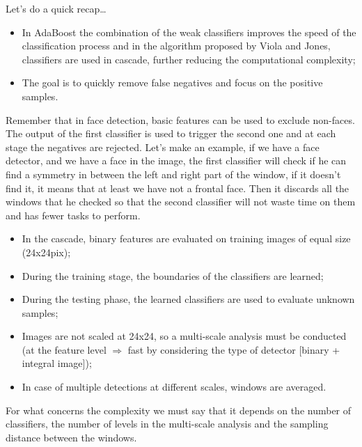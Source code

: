 Let's do a quick recap\dots
\begin{itemize}
    \item In AdaBoost the combination of the weak classifiers improves the speed of the classification process and in the algorithm proposed by Viola and Jones, classifiers are used
in cascade, further reducing the computational complexity;
    \item The goal is to quickly remove false negatives and focus on the positive samples.
\end{itemize}
Remember that in face detection, basic features can be used to exclude non-faces.
The output of the first classifier is used to trigger the second one and at each stage the negatives are rejected.
Let's make an example, if we have a face detector, and we have a face in the image, the first classifier will check if he can find a symmetry in between the left and right part of the window, if it doesn't find it, it means that at least we have not a frontal face. Then it discards all the windows that he checked so that the second classifier will not waste time on them and has fewer tasks to perform.
\begin{itemize}
    \item In the cascade, binary features are evaluated on training images of equal size (24x24pix);
    \item During the training stage, the boundaries of the classifiers are learned;
    \item During the testing phase, the learned classifiers are used to evaluate unknown samples;
    \item Images are not scaled at 24x24, so a multi-scale analysis must be conducted (at the feature level $\Rightarrow$ fast by considering the type of detector [binary + integral image]);
    \item In case of multiple detections at different scales, windows are averaged.
\end{itemize}
For what concerns the complexity we must say that it depends on the number of classifiers, the number of levels in the multi-scale analysis and the sampling distance between the windows.
